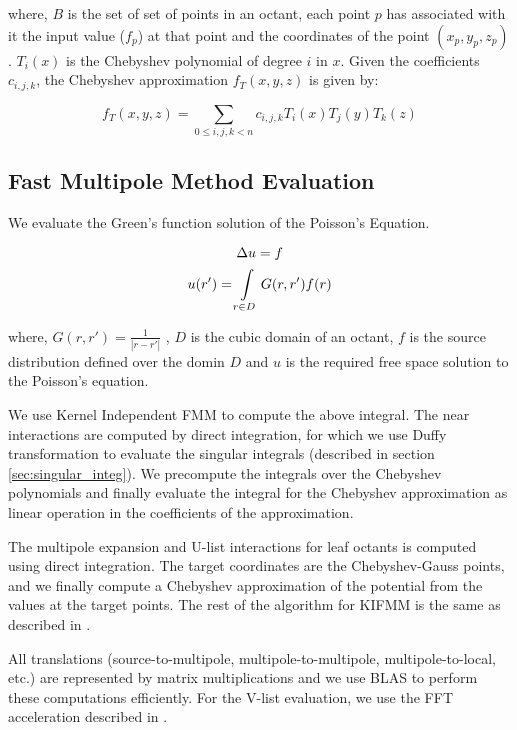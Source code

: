 \documentclass[11pt]{article}
\begin{document}
where, $B$ is the set of set of points in an octant, each point $p$ has 
associated with it the input value ($f_p$) at that point and the coordinates of 
the point $(x_p,y_p,z_p)$. $T_i(x)$ is the Chebyshev polynomial of degree $i$ in 
$x$. Given the coefficients $c_{i,j,k}$, the Chebyshev approximation $f_{T}(x,y,z)$ 
is given by:

\begin{equation}
f_{T}(x,y,z) = \sum_{0 \le i,j,k<n}{c_{i,j,k}T_{i}(x)T_{j}(y)T_{k}(z)}
\end{equation}


\subsection{Fast Multipole Method Evaluation}
We evaluate the Green's function solution of the Poisson's Equation.

\begin{equation}
\Delta{u} = f \notag
\end{equation}
\begin{equation}
u(r') = \int\limits_{r \in D} {G(r,r')f(r)} \notag
\end{equation}

where, $G(r,r')=\frac{1}{|r-r'|}$ , $D$ is the cubic domain of an octant, $f$ 
is the source distribution defined over the domin $D$ and $u$ is the required 
free space solution to the Poisson's equation.

We use Kernel Independent FMM to compute the above integral.
The near interactions are computed by direct integration, for which we use Duffy
transformation to evaluate the singular integrals (described in section 
\ref{sec:singular_integ}). We precompute the integrals over the Chebyshev 
polynomials and finally evaluate the integral for the Chebyshev approximation 
as linear operation in the coefficients of the approximation.

The multipole expansion and U-list interactions for leaf octants is computed 
using direct integration. The target coordinates are the Chebyshev-Gauss points,
and we finally compute a Chebyshev approximation of the potential from the 
values at the target points. The rest of the algorithm for KIFMM is the same as 
described in \cite{Ying03akernel-independent}.

All translations (source-to-multipole, multipole-to-multipole, 
multipole-to-local, etc.) are represented by matrix multiplications and we use 
BLAS to perform these computations efficiently. For the V-list evaluation, we 
use the FFT acceleration described in \cite{Ying03akernel-independent}.
\end{document}
